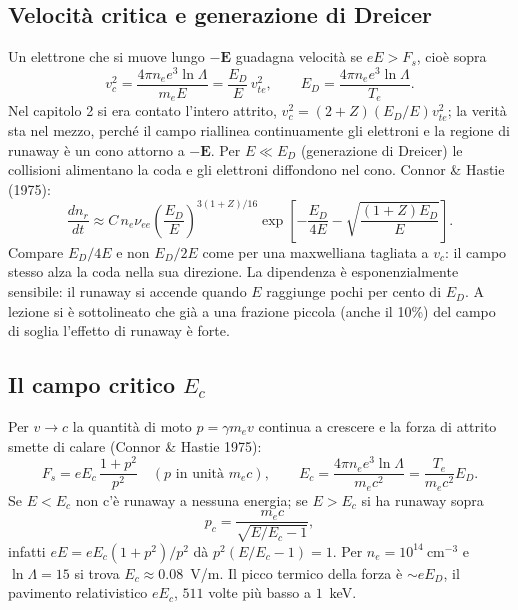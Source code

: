 \subsection{Velocità critica e generazione di Dreicer}
Un elettrone che si muove lungo $-\mathbf{E}$ guadagna velocità se $eE>F_s$, cioè sopra
\begin{equation}
v_c^2=\frac{4\pi n_ee^3\ln\Lambda}{m_eE}=\frac{E_D}{E}\,v_{te}^2,\qquad E_D=\frac{4\pi n_ee^3\ln\Lambda}{T_e}.
\end{equation}
Nel capitolo 2 si era contato l'intero attrito, $v_c^2=(2+Z)(E_D/E)v_{te}^2$; la verità sta nel mezzo, perché il campo riallinea continuamente gli elettroni e la regione di runaway è un cono attorno a $-\mathbf{E}$. Per $E\ll E_D$ (generazione di Dreicer) le collisioni alimentano la coda e gli elettroni diffondono nel cono. Connor \& Hastie (1975):
\begin{equation}
\frac{dn_r}{dt}\approx C\,n_e\nu_{ee}\left(\frac{E_D}{E}\right)^{3(1+Z)/16}\exp\left[-\frac{E_D}{4E}-\sqrt{\frac{(1+Z)E_D}{E}}\right].
\end{equation}
Compare $E_D/4E$ e non $E_D/2E$ come per una maxwelliana tagliata a $v_c$: il campo stesso alza la coda nella sua direzione. La dipendenza è esponenzialmente sensibile: il runaway si accende quando $E$ raggiunge pochi per cento di $E_D$. A lezione si è sottolineato che già a una frazione piccola (anche il 10\%) del campo di soglia l'effetto di runaway è forte.

\subsection{Il campo critico $E_c$}
Per $v\to c$ la quantità di moto $p=\gamma m_ev$ continua a crescere e la forza di attrito smette di calare (Connor \& Hastie 1975):
\begin{equation}
F_s=eE_c\,\frac{1+p^2}{p^2}\quad(p\text{ in unità }m_ec),\qquad E_c=\frac{4\pi n_ee^3\ln\Lambda}{m_ec^2}=\frac{T_e}{m_ec^2}E_D .
\end{equation}
Se $E<E_c$ non c'è runaway a nessuna energia; se $E>E_c$ si ha runaway sopra
\begin{equation}
p_c=\frac{m_ec}{\sqrt{E/E_c-1}},
\end{equation}
infatti $eE=eE_c(1+p^2)/p^2$ dà $p^2(E/E_c-1)=1$. Per $n_e=10^{14}\ \mathrm{cm^{-3}}$ e $\ln\Lambda=15$ si trova $E_c\approx0.08$~V/m. Il picco termico della forza è $\sim eE_D$, il pavimento relativistico $eE_c$, $511$ volte più basso a $1$~keV.

